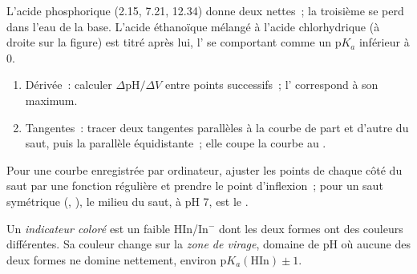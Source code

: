 L'acide phosphorique (2.15, 7.21, 12.34) donne deux 
nettes~; la troisième se perd dans l'eau de la base. L'acide éthanoïque
mélangé à l'acide chlorhydrique (à droite sur la figure) est titré après
lui, l' se comportant comme un $\mathrm{p}K_a$ inférieur à 0.

\begin{method}\label{met:b1:titration-methods:derivative}
\begin{enumerate}
  \item Dérivée~: calculer $\Delta\mathrm{pH}/\Delta V$ entre points
        successifs~; l' correspond à son maximum.
  \item Tangentes~: tracer deux tangentes parallèles à la courbe de part
        et d'autre du saut, puis la parallèle équidistante~; elle coupe
        la courbe au .
\end{enumerate}
\end{method}

\begin{method}\label{met:b1:titration-methods:tangents}
Pour une courbe enregistrée par ordinateur, ajuster les points de chaque
côté du saut par une fonction régulière et prendre le point
d'inflexion~; pour un saut symétrique (, ), le
milieu du saut, à pH 7, est le .
\end{method}

\begin{definition}\label{def:b1:titration-methods:indicator}
Un \emph{indicateur coloré} est un  faible
HIn/In$^-$ dont les deux formes ont des couleurs différentes. Sa couleur
change sur la \emph{zone de virage}, domaine de pH
où aucune des deux formes ne domine nettement, environ
$\mathrm{p}K_{a}(\mathrm{HIn}) \pm 1$.
\end{definition}

